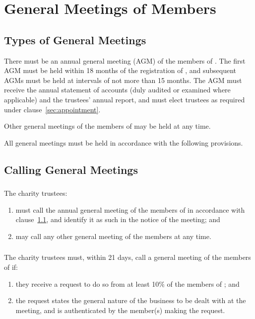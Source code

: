 \section{General Meetings of Members}\label{sec:general_meetings}

    \subsection{Types of General Meetings}\label{sec:general_meeting_types}
    There must be an annual general meeting (AGM) of the members of \shortname{}. The  first AGM must be held within 18 months of the registration of \shortname{}, and subsequent AGMs must be held at intervals of not more than 15 months. The AGM must receive the annual statement of accounts (duly audited or examined where applicable) and the trustees' annual report, and must elect trustees as required under clause~\ref{sec:appointment}.

    Other general meetings of the members of \shortname{} may be held at any time.

    All general meetings must be held in accordance with the following provisions.

    \subsection{Calling General Meetings}\label{sec:calling_general_meetings}

        \subsubsection{}
        The charity trustees:
        \begin{enumerate}
            \item must call the annual general meeting of the members of \shortname{} in accordance with clause~\ref{sec:general_meeting_types}, and identify it as such in the notice of the meeting; and
            \item may call any other general meeting of the members at any time.
        \end{enumerate}

        \subsubsection{}\label{sec:call_meeting_if}
        The charity trustees must, within 21 days, call a general meeting of the members of \shortname{} if:
        \begin{enumerate}
            \item\label{item:min_request} they receive a request to do so from at least 10\% of the members of \shortname{}; and

            \item the request states the general nature of the business to be dealt with at the meeting, and is authenticated by the member(s) making the request.
        \end{enumerate}

